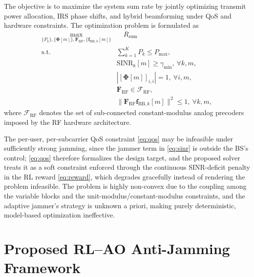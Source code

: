 \documentclass[10pt,conference]{IEEEtran}
\newcommand{\mat}[1]{\mathbf{#1}}
\begin{document}
The objective is to maximize the system sum rate by jointly optimizing transmit power allocation, IRS phase shifts, and hybrid beamforming under QoS and hardware constraints. The optimization problem is formulated as
\begin{subequations}
\begin{align}
\max_{\{P_k\}, \{\boldsymbol{\Phi}[m]\}, \mathbf{F}_{\mathrm{RF}}, \{\mathbf{f}_{\mathrm{BB},k}[m]\}}
& \quad R_{\mathrm{sum}} \label{eq:obj}\\
\text{s.t.} \quad
& \sum_{k=1}^{K} P_k \leq P_{\max},\label{eq:power} \\
& \mathrm{SINR}_k[m] \geq \gamma_{\min}, \ \forall k,m, \label{eq:qos}\\
& |[\boldsymbol{\Phi}[m]]_{i,i}| = 1, \ \forall i,m, \label{eq:unit}\\
& \mathbf{F}_{\mathrm{RF}} \in \mathcal{F}_{\mathrm{RF}}, \label{eq:bc}\\
& \|\mathbf{F}_{\mathrm{RF}}\mathbf{f}_{\mathrm{BB},k}[m]\|^2 \leq 1, \ \forall k,m,\label{eq:pn}
\end{align}
\end{subequations}
where $\mathcal{F}_{\mathrm{RF}}$ denotes the set of sub-connected constant-modulus analog precoders imposed by the RF hardware architecture.

The per-user, per-subcarrier QoS constraint \eqref{eq:qos} may be infeasible under sufficiently strong jamming, since the jammer term in \eqref{eq:sinr} is outside the BS's control; \eqref{eq:qos} therefore formalizes the design target, and the proposed solver treats it as a soft constraint enforced through the continuous SINR-deficit penalty in the RL reward \eqref{eq:reward}, which degrades gracefully instead of rendering the problem infeasible. The problem is highly non-convex due to the coupling among the variable blocks and the unit-modulus/constant-modulus constraints, and the adaptive jammer's strategy is unknown a priori, making purely deterministic, model-based optimization ineffective.

\section{Proposed RL--AO Anti-Jamming Framework}
\label{sec:rl}
\end{document}
